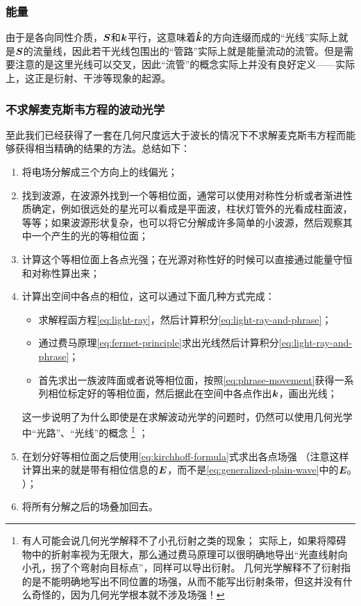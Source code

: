 \documentclass[UTF8, a4paper]{ctexart}
\begin{document}
\subsubsection{能量}

由于是各向同性介质，$\vb*{S}$和$\vb*{k}$平行，这意味着$\vu*{k}$的方向连缀而成的“光线”实际上就是$\vb*{S}$的流量线，因此若干光线包围出的“管路”实际上就是能量流动的流管。但是需要注意的是这里光线可以交叉，因此“流管”的概念实际上并没有良好定义——实际上，这正是衍射、干涉等现象的起源。

\subsubsection{不求解麦克斯韦方程的波动光学}

至此我们已经获得了一套在几何尺度远大于波长的情况下不求解麦克斯韦方程而能够获得相当精确的结果的方法。总结如下：
\begin{enumerate}
    \item 将电场分解成三个方向上的线偏光；
    \item 找到波源，在波源外找到一个等相位面，通常可以使用对称性分析或者渐进性质确定，例如很远处的星光可以看成是平面波，柱状灯管外的光看成柱面波，等等；如果波源形状复杂，也可以将它分解成许多简单的小波源，然后观察其中一个产生的光的等相位面；
    \item 计算这个等相位面上各点光强；在光源对称性好的时候可以直接通过能量守恒和对称性算出来；
    \item 计算出空间中各点的相位，这可以通过下面几种方式完成：
    \begin{itemize}
        \item 求解程函方程\eqref{eq:light-ray}，然后计算积分\eqref{eq:light-ray-and-phrase}；
        \item 通过费马原理\eqref{eq:fermet-principle}求出光线然后计算积分\eqref{eq:light-ray-and-phrase}；
        \item 首先求出一族波阵面或者说等相位面，按照\eqref{eq:phrase-movement}获得一系列相位标定好的等相位面，然后据此在空间中各点作出$\vb*{k}$，画出光线；
    \end{itemize}
    这一步说明了为什么即使是在求解波动光学的问题时，仍然可以使用几何光学中“光路”、“光线”的概念%
    \footnote{有人可能会说几何光学解释不了小孔衍射之类的现象；
    实际上，如果将障碍物中的折射率视为无限大，那么通过费马原理可以很明确地导出“光直线射向小孔，拐了个弯射向目标点”，同样可以导出衍射。
    几何光学解释不了衍射指的是不能明确地写出不同位置的场强，从而不能写出衍射条带，但这并没有什么奇怪的，因为几何光学根本就不涉及场强！}
    ；
    \item 在划分好等相位面之后使用\eqref{eq:kirchhoff-formula}式求出各点场强
    （注意这样计算出来的就是带有相位信息的$\vb*{E}$，而不是\eqref{eq:generalized-plain-wave}中的$\vb*{E}_0$）；
    \item 将所有分解之后的场叠加回去。
\end{enumerate}
\end{document}

